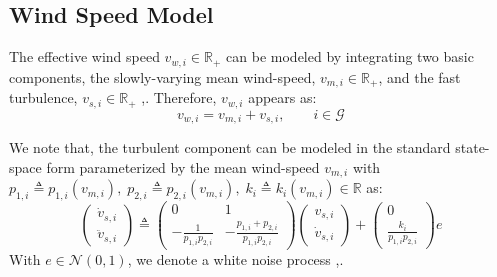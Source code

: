\documentclass[letterpaper, 10 pt, conference]{ieeeconf}
\begin{document}
\subsection{Wind Speed Model}
The effective wind speed $v_{w,i}\in \mathbb{R}_{+}$ can be modeled by integrating two basic components, the slowly-varying mean wind-speed, $v_{m,i}\in \mathbb{R}_{+}$, and the fast turbulence, $v_{s,i}\in \mathbb{R}_{+}$ \cite{larsen},\cite{thomsen}. Therefore, $v_{w,i}$ appears as:
\begin{equation}
v_{w,i}=v_{m,i}+v_{s,i},\qquad i\in\mathcal{G}
\end{equation}
 
We note that, the turbulent component can be modeled in the standard state-space form parameterized by the mean wind-speed $v_{m,i}$ with $p_{1,i}\triangleq p_{1,i}(v_{m,i}),\;p_{2,i}\triangleq p_{2,i}(v_{m,i}),\;k_i\triangleq k_i(v_{m,i})\in\mathbb{R}$ as:
\arraycolsep=1pt
\begin{equation}
\label{stochasticwind}
  \begin{pmatrix}
   \dot{v}_{s,i} \\
    \ddot{v}_{s,i}   \end{pmatrix} \triangleq
  \begin{pmatrix}
   0 & 1  \\
    -\frac{1}{p_{1,i}p_{2,i}}  &  -\frac{p_{1,i}+p_{2,i}}{p_{1,i}p_{2,i}}   \end{pmatrix}\begin{pmatrix}
   v_{s,i} \\
    \dot{v}_{s,i}   \end{pmatrix}+\begin{pmatrix}
   0 \\
   \frac{k_i}{p_{1,i}p_{2,i}}   \end{pmatrix}e
 \end{equation}
 With $e\in \mathcal{N}(0,1)$, we denote a white noise process \cite{larsen},\cite{thomsen}.
\end{document}
